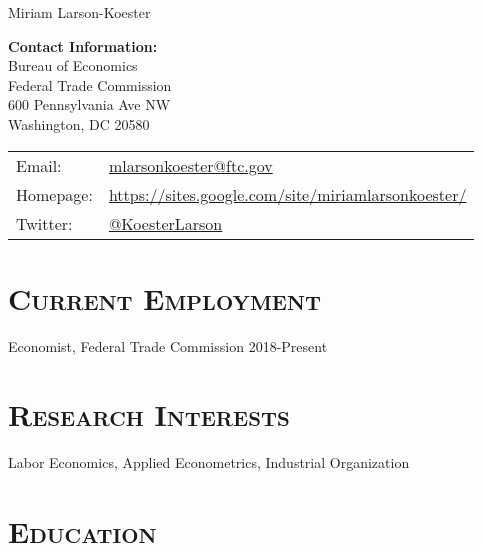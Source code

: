 \documentclass[10pt,letterpaper]{article}
\def\name{Miriam Larson-Koester}
\renewenvironment{itemize}{
  \begin{list}{}{
    \setlength{\leftmargin}{1.5em}
    \setlength{\itemsep}{0.25em}
    \setlength{\parskip}{0pt}
    \setlength{\parsep}{0.25em}
  }
}{
  \end{list}
}
\begin{document}
{\huge \name}


\bigskip


\begin{minipage}{0.37\linewidth}
{\bf Contact Information:}\\
Bureau of Economics \\
Federal Trade Commission\\
600 Pennsylvania Ave NW \\
 Washington, DC 20580 
\end{minipage}
\begin{minipage}{0.63\linewidth}
  \begin{tabular}{ll}
    Email: & \href{mailto:mlarsonkoester@ftc.gov}{mlarsonkoester@ftc.gov} \\
    Homepage: & \href{https://sites.google.com/site/miriamlarsonkoester/}{https://sites.google.com/site/miriamlarsonkoester/} \\
    Twitter: & \href{https://twitter.com/KoesterLarson}{@KoesterLarson}
  \end{tabular}
\end{minipage}
\vspace{3.5mm}

\section*{\scshape Current Employment}
\begin{itemize}
 \setlength{\itemsep}{1pt}
  \setlength{\parskip}{0pt}
  \setlength{\parsep}{0pt}
	\item Economist, Federal Trade Commission \hfill{2018-Present}

\end{itemize}

\section*{\scshape Research Interests}
\begin{itemize}
 \setlength{\itemsep}{1pt}
  \setlength{\parskip}{0pt}
  \setlength{\parsep}{0pt}
	\item Labor Economics, Applied Econometrics, Industrial Organization
\end{itemize}


\section*{\scshape Education}
\end{document}
